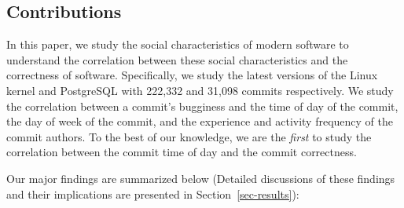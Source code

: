 \subsection{Contributions}
In this paper, we study the social characteristics of modern software to understand 
the correlation between these social characteristics and the correctness of software.  
Specifically, we study the latest versions of the Linux kernel and PostgreSQL with 222,332 and 31,098 commits respectively.
We study the correlation between a commit's bugginess
and the time of day of the commit, the day of week of the commit, and
the experience and activity frequency of the commit authors.
%
To the best of our
knowledge, we are the {\em first} to study the correlation between the commit time of day and
the commit correctness. 

Our major findings are summarized below (Detailed discussions of these findings and their implications are 
presented in Section~\ref{sec-results}): 

